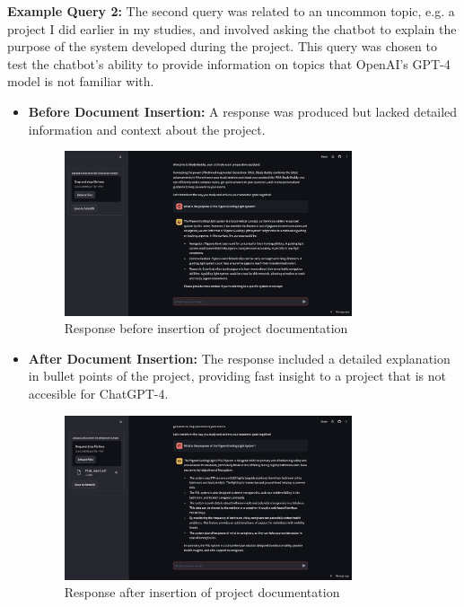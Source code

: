 \textbf{Example Query 2:}
The second query was related to an uncommon topic, e.g. a project I did earlier in my studies, and involved asking the chatbot to explain the purpose of the system developed during the project. This query was chosen to test the chatbot's ability to provide information on topics that OpenAI's GPT-4 model is not familiar with.
\begin{itemize}
    \item \textbf{Before Document Insertion:} A response was produced but lacked detailed information and context about the project. 
    \begin{figure}[H]
        \centering
        \includegraphics[width=0.8\textwidth]{figs/BeforePGL.png}
        \caption{Response before insertion of project documentation}
        \label{fig:before_project}
    \end{figure}
    \item \textbf{After Document Insertion:} The response included a detailed explanation in bullet points of the project, providing fast insight to a project that is not accesible for ChatGPT-4.
    \begin{figure}[H]
        \centering
        \includegraphics[width=0.8\textwidth]{figs/AfterPGL.png}
        \caption{Response after insertion of project documentation}
        \label{fig:after_project}
    \end{figure}
\end{itemize}

